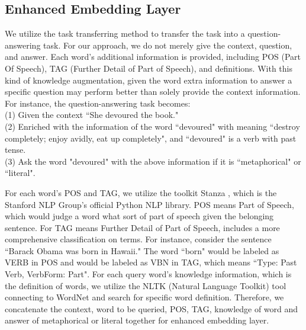 \documentclass[11pt,a4paper]{article}
\begin{document}
\subsection{Enhanced Embedding Layer}
We utilize the task transferring method to transfer the task into a question-answering task. For our approach, we do not merely give the context, question, and answer. Each word's additional information is provided, including POS (Part Of Speech), TAG (Further Detail of Part of Speech), and definitions. With this kind of knowledge augmentation, given the word extra information to answer a specific question may perform better than solely provide the context information. 
For instance, the question-answering task becomes: \\
(1) Given the context ``She devoured the book."\\
(2) Enriched with the information of the word ``devoured" with meaning ``destroy completely; enjoy avidly, eat up completely", and ``devoured" is a verb with past tense.\\
(3) Ask the word "devoured" with the above information if it is ``metaphorical" or ``literal".

For each word's POS and TAG, we utilize the toolkit Stanza \cite{qi2020stanza}, which is the Stanford NLP Group's official Python NLP library. POS means Part of Speech, which would judge a word what sort of part of speech given the belonging sentence. For TAG means Further Detail of Part of Speech, includes a more comprehensive classification on terms. For instance, consider the sentence ``Barack Obama was born in Hawaii." The word ``born" would be labeled as VERB in POS and would be labeled as VBN in TAG, which means ``Type: Past Verb, VerbForm: Part". For each query word's knowledge information, which is the definition of words, we utilize the NLTK (Natural Language Toolkit) tool connecting to WordNet and search for specific word definition. Therefore, we concatenate the context, word to be queried, POS, TAG, knowledge of word and answer of metaphorical or literal together for enhanced embedding layer.

\end{document}
